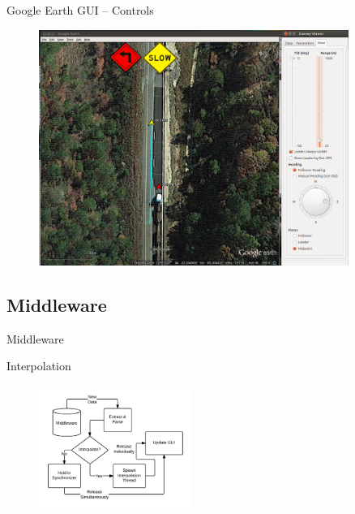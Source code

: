 \documentclass{beamer}
\begin{document}
    \begin{frame}{Google Earth GUI -- Controls}
      \begin{figure}
        \includegraphics[width=0.9\textwidth]{../graphics/earth_slow.png}
      \end{figure}
    \end{frame}


  \subsection{Middleware}

    \begin{frame}{Middleware}
    \end{frame}

    \begin{frame}{Interpolation}
      \begin{figure}[ht] \centering
        \includegraphics[width=5cm] {../graphics/middleware_diagram.png}
      \end{figure}
    \end{frame}


\end{document}
